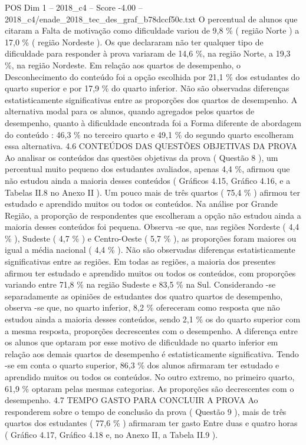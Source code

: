 \begin{textsample}{POS Dim 1 – 2018\_c4 – Score -4.00 – 2018\_c4/enade\_2018\_tec\_des\_graf\_b78dccf50c.txt}
O percentual de alunos que citaram a Falta de motivação como dificuldade variou de 9,8 \% ( região Norte ) a 17,0 \% ( região Nordeste ).
Os que declararam não ter qualquer tipo de dificuldade para responder à prova variaram de 14,6 \%, na região Norte, a 19,3 \%, na região Nordeste.
Em relação aos quartos de desempenho, o Desconhecimento do conteúdo foi a opção escolhida por 21,1 \% dos estudantes do quarto superior e por 17,9 \% do quarto inferior.
Não são observadas diferenças estatisticamente significativas entre as proporções dos quartos de desempenho.
A alternativa modal para os alunos, quando agregados pelos quartos de desempenho, quanto à dificuldade encontrada foi a Forma diferente de abordagem do conteúdo : 46,3 \% no terceiro quarto e 49,1 \% do segundo quarto escolheram essa alternativa. 4.6 CONTEÚDOS DAS QUESTÕES OBJETIVAS DA PROVA Ao analisar os conteúdos das questões objetivas da prova ( Questão 8 ), um percentual muito pequeno dos estudantes avaliados, apenas 4,4 \%, afirmou que não estudou ainda a maioria desses conteúdos ( Gráficos 4.15, Gráfico 4.16, e a Tabelas II.8 no Anexo II ).
Um pouco mais de três quartos ( 75,4 \% ) afirmou ter estudado e aprendido muitos ou todos os conteúdos.
Na análise por Grande Região, a proporção de respondentes que escolheram a opção não estudou ainda a maioria desses conteúdos foi pequena.
Observa -se que, nas regiões Nordeste ( 4,4 \% ), Sudeste ( 4,7 \% ) e Centro-Oeste ( 5,7 \% ), as proporções foram maiores ou igual a média nacional ( 4,4 \% ).
Não são observadas diferenças estatisticamente significativas entre as regiões.
Em todas as regiões, a maioria dos presentes afirmou ter estudado e aprendido muitos ou todos os conteúdos, com proporções variando entre 71,8 \% na região Sudeste e 83,5 \% na Sul.
Considerando -se separadamente as opiniões de estudantes dos quatro quartos de desempenho, observa -se que, no quarto inferior, 8,2 \% ofereceram como resposta que não estudou ainda a maioria desses conteúdos, sendo 2,1 \% os do quarto superior com a mesma resposta, proporções decrescentes com o desempenho.
A diferença entre os alunos que optaram por esse motivo de dificuldade no quarto inferior em relação aos demais quartos de desempenho é estatisticamente significativa.
Tendo -se em conta o quarto superior, 86,3 \% dos alunos afirmaram ter estudado e aprendido muitos ou todos os conteúdos.
No outro extremo, no primeiro quarto, 61,9 \% optaram pelas mesmas categorias.
As proporções são decrescentes com o desempenho. 4.7 TEMPO GASTO PARA CONCLUIR A PROVA Ao responderem sobre o tempo de conclusão da prova ( Questão 9 ), mais de três quartos dos estudantes ( 77,6 \% ) afirmaram ter gasto Entre duas e quatro horas ( Gráfico 4.17, Gráfico 4.18 e, no Anexo II, a Tabela II.9 ).

\end{textsample}
